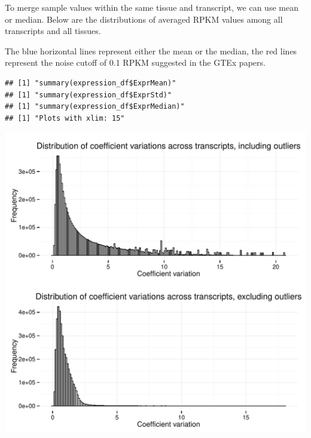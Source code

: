 \documentclass{article}\usepackage[]{graphicx}\usepackage[]{color}
\makeatletter
\def\maxwidth{ %
  \ifdim\Gin@nat@width>\linewidth
    \linewidth
  \else
    \Gin@nat@width
  \fi
}
\newenvironment{kframe}{%
 \def\at@end@of@kframe{}%
 \ifinner\ifhmode%
  \def\at@end@of@kframe{\end{minipage}}%
  \begin{minipage}{\columnwidth}%
 \fi\fi%
 \def\FrameCommand##1{\hskip\@totalleftmargin \hskip-\fboxsep
 \colorbox{shadecolor}{##1}\hskip-\fboxsep
     \hskip-\linewidth \hskip-\@totalleftmargin \hskip\columnwidth}%
 \MakeFramed {\advance\hsize-\width
   \@totalleftmargin\z@ \linewidth\hsize
   \@setminipage}}%
 {\par\unskip\endMakeFramed%
 \at@end@of@kframe}
\newenvironment{knitrout}{}{} %
\makeatother
\begin{document}
To merge sample values within the same tissue and transcript, we can use mean or median. Below are the distributions of averaged RPKM values among all transcripts and all tissues.\par
The blue horizontal lines represent either the mean or the median, the red lines represent the noise cutoff of 0.1 RPKM suggested in the GTEx papers.

\begin{knitrout}
\color{fgcolor}\begin{kframe}
\begin{verbatim}
## [1] "summary(expression_df$ExprMean)"
## [1] "summary(expression_df$ExprStd)"
## [1] "summary(expression_df$ExprMedian)"
## [1] "Plots with xlim: 15"
\end{verbatim}
\end{kframe}
\includegraphics[width=\maxwidth]{figure/transcript_expression_averages-1} 


\end{knitrout}
\end{document}

